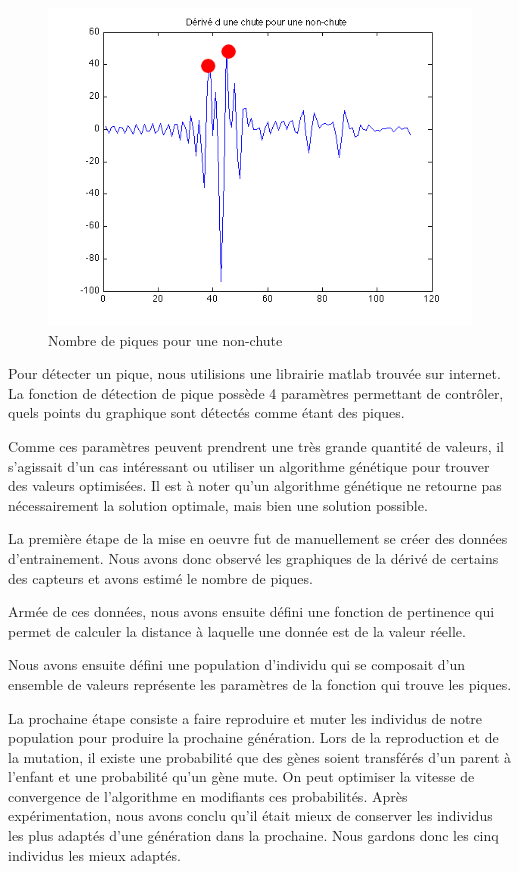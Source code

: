 \documentclass[12pt,letterpaper]{article}
\begin{document}
\begin{figure}[htp]
\centering
\includegraphics{images/piques_nonchute.png}
\caption{Nombre de piques pour une non-chute}
\label{fig:nonchute}
\end{figure}


Pour détecter un pique, nous utilisions une librairie matlab trouvée sur internet. La fonction de détection de pique
possède 4 paramètres permettant de contrôler, quels points du graphique sont détectés comme étant des piques.

Comme ces paramètres peuvent prendrent une très grande quantité de valeurs, il s'agissait d'un cas intéressant ou utiliser
un algorithme génétique pour trouver des valeurs optimisées. Il est à noter qu'un algorithme génétique ne retourne pas
nécessairement la solution optimale, mais bien une solution possible.

La première étape de la mise en oeuvre fut de manuellement se créer des données d'entrainement. Nous avons donc
observé les graphiques de la dérivé de certains des capteurs et avons estimé le nombre de piques.

Armée de ces données, nous avons ensuite défini une fonction de pertinence qui permet de calculer la distance à laquelle
une donnée est de la valeur réelle.

Nous avons ensuite défini une population d'individu qui se composait d'un ensemble de valeurs représente les paramètres de la
fonction qui trouve les piques.

La prochaine étape consiste a faire reproduire et muter les individus de notre population pour produire la prochaine génération.
Lors de la reproduction et de la mutation, il existe une probabilité que des gènes soient transférés d'un parent à l'enfant et une
probabilité qu'un gène mute. On peut optimiser la vitesse de convergence de l'algorithme en modifiants ces probabilités. Après
expérimentation, nous avons conclu qu'il était mieux de conserver les individus les plus adaptés d'une génération dans la prochaine.
Nous gardons donc les cinq individus les mieux adaptés.
\end{document}
